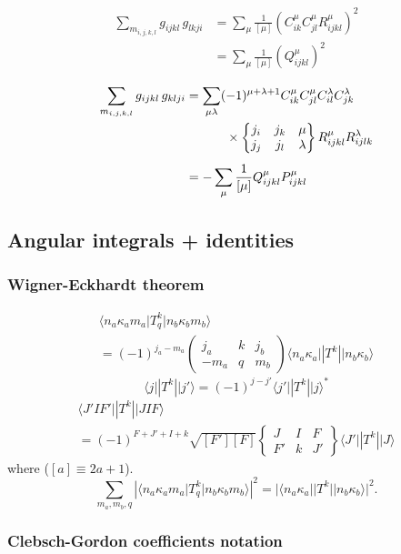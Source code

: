 \documentclass[10pt,twocolumn,a4paper]{article}%
\newcommand{\bra}[1]{\ensuremath{\langle #1|}}	%
\newcommand{\ket}[1]{\ensuremath{|#1\rangle}}	%
\newcommand{\threej}[6]{\ensuremath{\begin{pmatrix}#1&#2&#3\\#4&#5&#6\end{pmatrix}}}	%
\newcommand{\sixj}[6]{\ensuremath{\begin{Bmatrix}#1&#2&#3\\#4&#5&#6\end{Bmatrix}}}	%
\newcommand{\be}{\begin{equation}}
\newcommand{\ee}{\end{equation}}
\renewcommand{\k}{\ensuremath{\kappa}}
\begin{document}
\begin{align}
\sum_{m_{i,j,k,l}}  g_{ijkl} \, g_{lkji}
    &= \sum_\mu \frac{1}{[\mu]} \left( C^\mu_{ik}C^\mu_{jl} R^\mu_{ijkl}\right)^2 \\
    &= \sum_\mu \frac{1}{[\mu]} \left( Q^\mu_{ijkl}\right)^2
\end{align}

\begin{align}
\sum_{m_{i,j,k,l}}  g_{ijkl} \, g_{klji}
    &=\sum_{\mu \lambda}(-1)^{\mu+\lambda+1}C^\mu_{ik}C^\mu_{jl}C^\lambda_{il}C^\lambda_{jk} \notag \\
    &\phantom{=\sum_{\mu \lambda}}~~\times \sixj{j_i}{j_k}{\mu}{j_j}{j_l}{\lambda}R^\mu_{ijkl}R^\lambda_{ijlk} \\
    &=-\sum_\mu \frac{1}{[\mu]}  Q^\mu_{ijkl}P^\mu_{ijkl}
\end{align}



\subsection{Angular integrals + identities}


\subsubsection*{Wigner-Eckhardt theorem}
\begin{multline}
\bra{n_a \k_a m_a}T^k_q\ket{n_b \k_b m_b} \\= (-1)^{j_a-m_a}\threej{j_a}{k}{j_b}{-m_a}{q}{m_b} \bra{n_a \k_a}|T^k|\ket{n_b \k_b}
\end{multline}
\be
\bra{j}|T^k|\ket{j'} = (-1)^{j-j'}\bra{j'}|T^k|\ket{j}^*
\ee
%
\begin{multline}
\bra{J'IF'}|T^k|\ket{JIF} \\= (-1)^{F+J'+I+k}\sqrt{[F'][F]}\sixj{J}{I}{F}{F'}{k}{J'}\bra{J'}|T^k|\ket{J}
\end{multline}
where ($[a]\equiv2a+1$).
%
\be
\sum_{m_a,m_b,q} |\bra{n_a \k_a m_a}T^k_q\ket{n_b \k_b m_b}|^2 = |\bra{n_a \k_a}|T^k|\ket{n_b \k_b}|^2.
\ee







\subsubsection*{Clebsch-Gordon coefficients notation}
\end{document}
